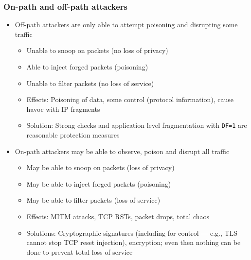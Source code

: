 \documentclass{beamer}
\begin{document}
\frame
{
  \frametitle{On-path and off-path attackers}

  \begin{itemize}
    \item Off-path attackers are only able to attempt poisoning and
      disrupting some traffic
      \begin{itemize}
      \item Unable to snoop on packets (no loss of privacy)
      \item Able to inject forged packets (poisoning)
      \item Unable to filter packets (no loss of service)
      \item Effects: Poisoning of data, some control (protocol
        information), cause havoc with IP fragments
      \item Solution: Strong checks and application level fragmentation
        with \texttt{DF=1} are reasonable protection measures
      \end{itemize}
    \item On-path attackers may be able to observe, poison and disrupt
      all traffic
      \begin{itemize}
      \item May be able to snoop on packets (loss of privacy)
      \item May be able to inject forged packets (poisoning)
      \item May be able to filter packets (loss of service)
      \item Effects: MITM attacks, TCP RSTs, packet drops, total chaos
      \item Solutions: Cryptographic signatures (including for control
        --- e.g., TLS cannot stop TCP reset injection), encryption; even
        then nothing can be done to prevent total loss of service
      \end{itemize}
  \end{itemize}
}
\end{document}
